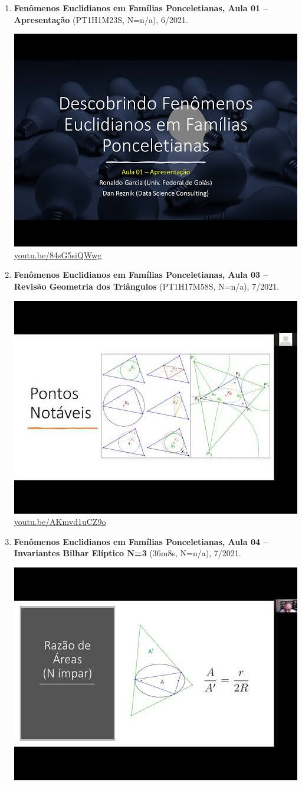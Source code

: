 \documentclass[12pt]{amsart}
\begin{document}
\begin{enumerate}[resume]
\item \textbf{Fenômenos Euclidianos em Famílias Ponceletianas, Aula 01 -- Apresentação} (PT1H1M23S, N=n/a), 6/2021. 
\begin{center}\includegraphics[width=.5\textwidth]{pics/84sG5siQWwg.jpg} \\ 
\href{https://youtu.be/84sG5siQWwg}{\url{youtu.be/84sG5siQWwg}}\end{center}
% 
\item \textbf{Fenômenos Euclidianos em Famílias Ponceletianas, Aula 03 -- Revisão Geometria dos Triângulos} (PT1H17M58S, N=n/a), 7/2021. 
\begin{center}\includegraphics[width=.5\textwidth]{pics/AKmvd1uCZ9o.jpg} \\ 
\href{https://youtu.be/AKmvd1uCZ9o}{\url{youtu.be/AKmvd1uCZ9o}}\end{center}
% 
\item \textbf{Fenômenos Euclidianos em Famílias Ponceletianas, Aula 04 -- Invariantes Bilhar Elíptico N=3} (36m8s, N=n/a), 7/2021. 
\begin{center}\includegraphics[width=.5\textwidth]{pics/ti1rkBK62ck.jpg} \\ 

\end{center}
\end{enumerate}
\end{document}
